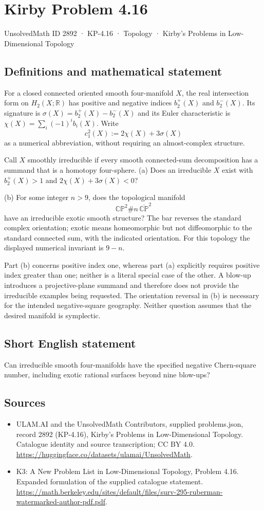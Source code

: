 \documentclass[11pt,a4paper]{article}
\begin{document}
\section*{Kirby Problem 4.16}\label{2892}
{\small UnsolvedMath ID 2892 · KP-4.16 · Topology · Kirby's Problems in Low-Dimensional Topology}
\subsection{Definitions and mathematical statement}
For a closed connected oriented smooth four-manifold $X$, the real intersection form on $H_2(X;\mathbb R)$ has positive and negative indices $b_2^+(X)$ and $b_2^-(X)$. Its signature is $\sigma(X)=b_2^+(X)-b_2^-(X)$ and its Euler characteristic is $\chi(X)=\sum_i(-1)^i b_i(X)$. Write
\[
c_1^2(X):=2\chi(X)+3\sigma(X)
\]
as a numerical abbreviation, without requiring an almost-complex structure.

Call $X$ smoothly irreducible if every smooth connected-sum decomposition has a summand that is a homotopy four-sphere. (a) Does an irreducible $X$ exist with $b_2^+(X)>1$ and $2\chi(X)+3\sigma(X)<0$?

(b) For some integer $n>9$, does the topological manifold
\[
\mathbb{CP}^2\#n\,\overline{\mathbb{CP}}^{2}
\]
have an irreducible exotic smooth structure? The bar reverses the standard complex orientation; exotic means homeomorphic but not diffeomorphic to the standard connected sum, with the indicated orientation. For this topology the displayed numerical invariant is $9-n$.

Part (b) concerns positive index one, whereas part (a) explicitly requires positive index greater than one; neither is a literal special case of the other. A blow-up introduces a projective-plane summand and therefore does not provide the irreducible examples being requested. The orientation reversal in (b) is necessary for the intended negative-square geography. Neither question assumes that the desired manifold is symplectic.
\subsection{Short English statement}
Can irreducible smooth four-manifolds have the specified negative Chern-square number, including exotic rational surfaces beyond nine blow-ups?
\subsection{Sources}
\begin{itemize}
\item[S1] ULAM.AI and the UnsolvedMath Contributors, supplied problems.json, record 2892 (KP-4.16), Kirby's Problems in Low-Dimensional Topology. Catalogue identity and source transcription; CC BY 4.0.
\url{https://huggingface.co/datasets/ulamai/UnsolvedMath}.
\item[S2] K3: A New Problem List in Low-Dimensional Topology, Problem 4.16. Expanded formulation of the supplied catalogue statement.
\url{https://math.berkeley.edu/sites/default/files/surv-295-ruberman-watermarked-author-pdf.pdf}.
\end{itemize}
\end{document}

